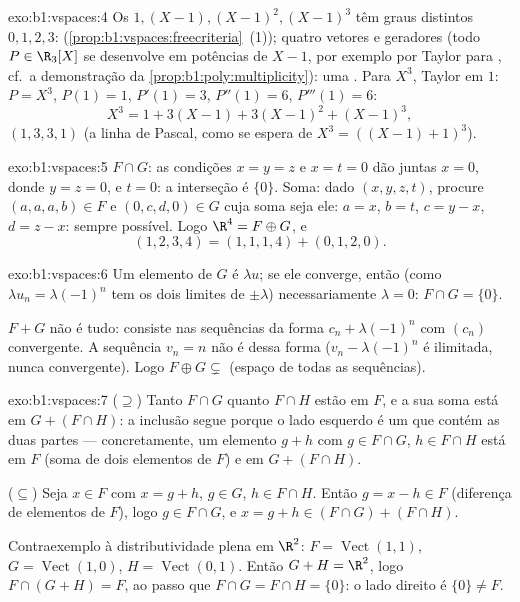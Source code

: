 \begin{solution}{exo:b1:vspaces:4}
Os  $1, (X-1), (X-1)^2, (X-1)^3$ têm graus distintos $0,
1, 2, 3$: 
(\cref{prop:b1:vspaces:freecriteria}~(1)); quatro vetores  e geradores (todo $P \in \R_3[X]$ se
desenvolve em potências de $X - 1$, por exemplo por Taylor para
, cf.\ a demonstração da \cref{prop:b1:poly:multiplicity}): uma . Para $X^3$,
Taylor em $1$: $P = X^3$, $P(1) = 1$, $P'(1) = 3$, $P''(1) = 6$, $P'''(1) =
6$:
\[
X^3 = 1 + 3(X - 1) + 3(X-1)^2 + (X-1)^3 ,
\]
 $(1, 3, 3, 1)$ (a linha de Pascal, como se espera de $X^3 =
((X-1)+1)^3$).
\end{solution}

\begin{solution}{exo:b1:vspaces:5}
$F \cap G$: as condições $x = y = z$ e $x = t = 0$ dão juntas $x = 0$, donde $y = z = 0$,
e $t = 0$: a interseção é $\{0\}$. Soma: dado $(x,y,z,t)$, procure $(a,a,a,b) \in F$ e
$(0,c,d,0) \in G$ cuja soma seja ele: $a = x$, $b = t$, $c = y - x$, $d =
z - x$: sempre
possível. Logo $\R^4 = F \oplus G$, e
\[
(1,2,3,4) = (1,1,1,4) + (0,1,2,0) .
\]
\end{solution}

\begin{solution}{exo:b1:vspaces:6}
Um elemento de $G$ é $\lambda u$; se ele converge, então (como
$\lambda u_n = \lambda(-1)^n$ tem os dois limites de  $\pm
\lambda$) necessariamente
$\lambda = 0$: $F \cap G = \{0\}$.

$F + G$ não é tudo: consiste nas sequências da forma
$c_n + \lambda(-1)^n$ com $(c_n)$ convergente. A sequência $v_n =
n$ não é dessa forma ($v_n - \lambda(-1)^n$ é ilimitada, nunca convergente).
Logo $F \oplus G \subsetneq$ (espaço de todas as sequências).
\end{solution}

\begin{solution}{exo:b1:vspaces:7}
($\supseteq$) Tanto $F \cap G$ quanto $F \cap H$ estão em $F$, e a sua soma está em
$G + (F \cap H)$: a inclusão segue porque o lado esquerdo é um  que
contém as duas partes --- concretamente, um elemento $g + h$ com
$g \in F\cap G$, $h \in F \cap H$ está em $F$ (soma de dois elementos de $F$) e em $G + (F \cap H)$.

($\subseteq$) Seja $x \in F$ com $x = g + h$, $g \in G$, $h \in F
\cap H$. Então $g = x - h \in F$
(diferença de elementos de $F$), logo $g \in F \cap G$, e $x = g + h \in (F \cap G) + (F \cap H)$.

Contraexemplo à distributividade plena em $\R^2$: $F =
\operatorname{Vect}(1,1)$, $G = \operatorname{Vect}(1,0)$,
$H =
\operatorname{Vect}(0,1)$. Então $G + H = \R^2$, logo $F \cap (G+H) =
F$, ao passo que $F \cap G = F \cap H = \{0\}$: o lado direito
é $\{0\}
\neq F$.
\end{solution}

